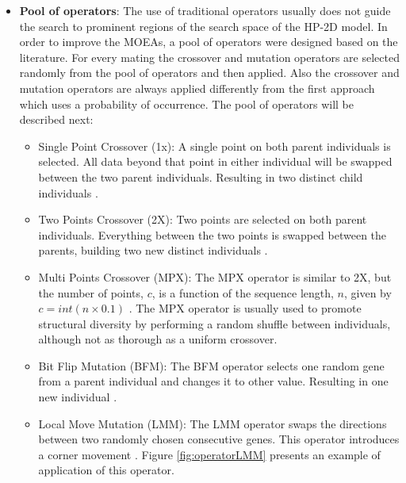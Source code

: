 \begin{itemize}
	
	\item \textbf{Pool of operators}: The use of traditional operators usually does not guide the search to prominent regions of the search space of the HP-2D model. In order to improve the MOEAs, a pool of operators were designed based on the literature. For every mating the crossover and mutation operators are selected randomly from the pool of operators and then applied. Also the crossover and mutation operators are always applied differently from the first approach which uses a probability of occurrence. The pool of operators will be described next:
	
	\begin{itemize}
		\item Single Point Crossover (1x): A single point on both parent individuals is selected. All data beyond that point in either individual will be swapped between the two parent individuals. Resulting in two distinct child individuals \cite{holland1975adaptation}.
		
		\item Two Points Crossover (2X): Two points are selected on both parent individuals. Everything between the two points is swapped between the parents, building two new distinct individuals \cite{holland1975adaptation}.
		
		\item Multi Points Crossover (MPX): The MPX operator is similar to 2X, but the number of points, $c$, is a function of the sequence length, $n$, given by $c = int(n \times 0.1)$ \cite{custodio2004investigation}. The MPX operator is usually used to promote structural diversity by performing a random shuffle between individuals, although not as thorough as a uniform crossover.
		
		\item Bit Flip Mutation (BFM): The BFM operator selects one random gene from a parent individual and changes it to other value. Resulting in one new individual \cite{holland1975adaptation}.
		
		\item Local Move Mutation (LMM): The LMM operator swaps the directions between two randomly chosen consecutive genes. This operator introduces a corner movement \cite{bazzoli2004memetic}. Figure \ref{fig:operatorLMM} presents an example of application of this operator.
		
		
		

\end{itemize}
\end{itemize}

